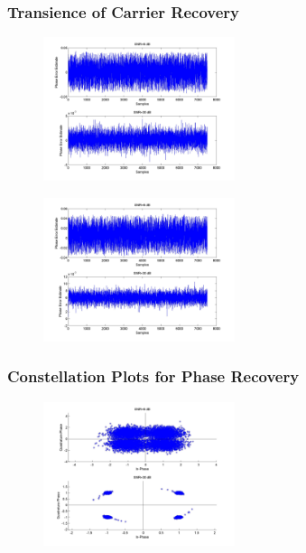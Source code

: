 \documentclass[]{article}
\begin{document}
\subsubsection{Transience of Carrier Recovery}
\begin{figure}[H]
\centering
\hspace*{-2cm}\includegraphics[width=0.5\textwidth]{qpLoopFilterfo_ddr1.jpg}
\caption{}
\end{figure}

\begin{figure}[H]
\centering
\hspace*{-2cm}\includegraphics[width=0.5\textwidth]{qpLoopFilterfo_ddr2.jpg}
\caption{}
\end{figure}
\subsubsection{Constellation Plots  for Phase Recovery}
\begin{figure}[H]
\centering
\hspace*{-2cm}\includegraphics[width=0.5\textwidth]{qpConstpo_ddr1.jpg}
\caption{}
\end{figure}
\end{document}
